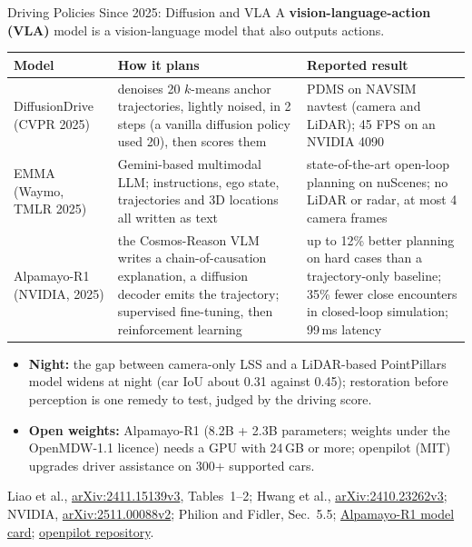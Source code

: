 \begin{frame}{Driving Policies Since 2025: Diffusion and VLA}
  \footnotesize A \textbf{vision-language-action (VLA)} model is a vision-language model that also outputs actions.\par
  \vspace{0.1em}
  {\centering\scriptsize
  \begin{tabular}{>{\raggedright\arraybackslash}p{1.9cm} >{\raggedright\arraybackslash}p{5.5cm} >{\raggedright\arraybackslash}p{4.9cm}}
    \toprule
    \textbf{Model} & \textbf{How it plans} & \textbf{Reported result} \\
    \midrule
    DiffusionDrive (CVPR 2025) & denoises 20 $k$-means anchor trajectories, lightly noised, in 2 steps (a vanilla diffusion policy used 20), then scores them & 88.1 PDMS on NAVSIM navtest (camera and LiDAR); 45 FPS on an NVIDIA 4090 \\
    \addlinespace[0.2em]
    EMMA (Waymo, TMLR 2025) & Gemini-based multimodal LLM; instructions, ego state, trajectories and 3D locations all written as text & state-of-the-art open-loop planning on nuScenes; no LiDAR or radar, at most 4 camera frames \\
    \addlinespace[0.2em]
    Alpamayo-R1 (NVIDIA, 2025) & the Cosmos-Reason VLM writes a chain-of-causation explanation, a diffusion decoder emits the trajectory; supervised fine-tuning, then reinforcement learning & up to 12\% better planning on hard cases than a trajectory-only baseline; 35\% fewer close encounters in closed-loop simulation; 99\,ms latency \\
    \bottomrule
  \end{tabular}\par}
  \vspace{0.1em}
  \begin{itemize}\footnotesize\itemsep0.2em
    \item \textbf{Night:} the gap between camera-only LSS and a LiDAR-based PointPillars model widens at night (car IoU about 0.31 against 0.45); restoration before perception is one remedy to test, judged by the driving score.
    \item \textbf{Open weights:} Alpamayo-R1 (8.2B + 2.3B parameters; weights under the OpenMDW-1.1 licence) needs a GPU with 24\,GB or more; openpilot (MIT) upgrades driver assistance on 300+ supported cars.
  \end{itemize}
  \vspace{0.1em}
  {\scriptsize Liao et al., \href{https://arxiv.org/abs/2411.15139v3}{arXiv:2411.15139v3}, Tables~1--2; Hwang et al., \href{https://arxiv.org/abs/2410.23262v3}{arXiv:2410.23262v3}; NVIDIA, \href{https://arxiv.org/abs/2511.00088v2}{arXiv:2511.00088v2}; Philion and Fidler, Sec.~5.5; \href{https://huggingface.co/nvidia/Alpamayo-R1-10B}{Alpamayo-R1 model card}; \href{https://github.com/commaai/openpilot}{openpilot repository}.\par}
\end{frame}
